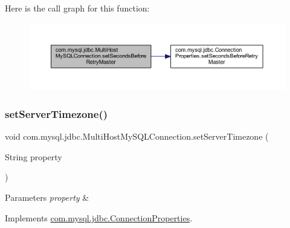 Here is the call graph for this function\+:
\nopagebreak
\begin{figure}[H]
\begin{center}
\leavevmode
\includegraphics[width=350pt]{classcom_1_1mysql_1_1jdbc_1_1_multi_host_my_s_q_l_connection_a7604c2e4bfbbb42ec5ce170e86970ef3_cgraph}
\end{center}
\end{figure}
\mbox{\label{classcom_1_1mysql_1_1jdbc_1_1_multi_host_my_s_q_l_connection_a49872e46bc69088b63f84767c386e811}} 
\subsubsection{\texorpdfstring{set\+Server\+Timezone()}{setServerTimezone()}}
{\footnotesize\ttfamily void com.\+mysql.\+jdbc.\+Multi\+Host\+My\+S\+Q\+L\+Connection.\+set\+Server\+Timezone (\begin{DoxyParamCaption}\item[{String}]{property }\end{DoxyParamCaption})}


\begin{DoxyParams}{Parameters}
{\em property} & \\
\hline
\end{DoxyParams}


Implements \mbox{\hyperlink{interfacecom_1_1mysql_1_1jdbc_1_1_connection_properties_a696230dd8e57568c8742fffecb1040aa}{com.\+mysql.\+jdbc.\+Connection\+Properties}}.

